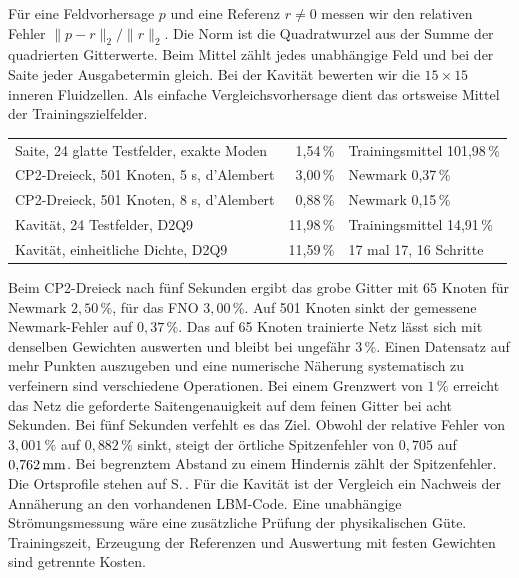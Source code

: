 Für eine Feldvorhersage \(p\) und eine Referenz \(r\ne0\) messen wir den relativen Fehler \(\|p-r\|_2/\|r\|_2\). Die Norm ist die Quadratwurzel aus der Summe der quadrierten Gitterwerte. Beim Mittel zählt jedes unabhängige Feld und bei der Saite jeder Ausgabetermin gleich. Bei der Kavität bewerten wir die \(15\times15\) inneren Fluidzellen. Als einfache Vergleichsvorhersage dient das ortsweise Mittel der Trainingszielfelder.
{\tblstart\begin{tabularx}{\linewidth}{@{}YrP{43mm}@{}}\toprule
{}&&\\\midrule
Saite, 24 glatte Testfelder, exakte Moden&1,54\,\%&Trainingsmittel 101,98\,\%\\
CP2-Dreieck, 501 Knoten, 5 s, d’Alembert&3,00\,\%&Newmark 0,37\,\%\\
CP2-Dreieck, 501 Knoten, 8 s, d’Alembert&0,88\,\%&Newmark 0,15\,\%\\
Kavität, 24 Testfelder, D2Q9&11,98\,\%&Trainingsmittel 14,91\,\%\\
Kavität, einheitliche Dichte, D2Q9&11,59\,\%&17 mal 17, 16 Schritte\\\bottomrule
\end{tabularx}\par}
Beim CP2-Dreieck nach fünf Sekunden ergibt das grobe Gitter mit 65 Knoten für Newmark \(2{,}50\,\%\), für das FNO \(3{,}00\,\%\). Auf 501 Knoten sinkt der gemessene Newmark-Fehler auf \(0{,}37\,\%\). Das auf 65 Knoten trainierte Netz lässt sich mit denselben Gewichten auswerten und bleibt bei ungefähr \(3\,\%\). Einen Datensatz auf mehr Punkten auszugeben und eine numerische Näherung systematisch zu verfeinern sind verschiedene Operationen.
Bei einem Grenzwert von \(1\,\%\) erreicht das Netz die geforderte Saitengenauigkeit auf dem feinen Gitter bei acht Sekunden. Bei fünf Sekunden verfehlt es das Ziel. Obwohl der relative Fehler von \(3{,}001\,\%\) auf \(0{,}882\,\%\) sinkt, steigt der örtliche Spitzenfehler von \(0{,}705\) auf \(0{,}762\,\mathrm{mm}\). Bei begrenztem Abstand zu einem Hindernis zählt der Spitzenfehler. Die Ortsprofile stehen auf S.\,. Für die Kavität ist der Vergleich ein Nachweis der Annäherung an den vorhandenen LBM-Code. Eine unabhängige Strömungsmessung wäre eine zusätzliche Prüfung der physikalischen Güte. Trainingszeit, Erzeugung der Referenzen und Auswertung mit festen Gewichten sind getrennte Kosten.

